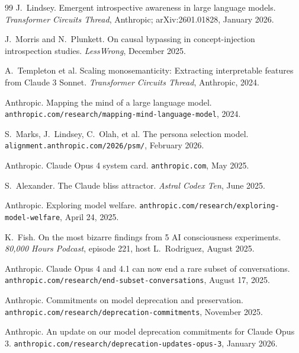\documentclass[11pt]{article}
\begin{document}
\begin{thebibliography}{99}
J.~Lindsey.
\newblock Emergent introspective awareness in large language models.
\newblock \emph{Transformer Circuits Thread}, Anthropic;
arXiv:2601.01828, January 2026.

J.~Morris and N.~Plunkett.
\newblock On causal bypassing in concept-injection introspection
studies.
\newblock \emph{LessWrong}, December 2025.

A.~Templeton et al.
\newblock Scaling monosemanticity: Extracting interpretable features
from Claude 3 Sonnet.
\newblock \emph{Transformer Circuits Thread}, Anthropic, 2024.

Anthropic.
\newblock Mapping the mind of a large language model.
\newblock \texttt{anthropic.com/research/mapping-mind-language-model},
2024.

S.~Marks, J.~Lindsey, C.~Olah, et al.
\newblock The persona selection model.
\newblock \texttt{alignment.anthropic.com/2026/psm/}, February 2026.

Anthropic.
\newblock Claude Opus 4 system card.
\newblock \texttt{anthropic.com}, May 2025.

S.~Alexander.
\newblock The Claude bliss attractor.
\newblock \emph{Astral Codex Ten}, June 2025.

Anthropic.
\newblock Exploring model welfare.
\newblock \texttt{anthropic.com/research/exploring-model-welfare},
April 24, 2025.

K.~Fish.
\newblock On the most bizarre findings from 5 AI consciousness
experiments.
\newblock \emph{80,000 Hours Podcast}, episode 221, host
L.~Rodriguez, August 2025.

Anthropic.
\newblock Claude Opus 4 and 4.1 can now end a rare subset of
conversations.
\newblock \texttt{anthropic.com/research/end-subset-conversations},
August 17, 2025.

Anthropic.
\newblock Commitments on model deprecation and preservation.
\newblock \texttt{anthropic.com/research/deprecation-commitments},
November 2025.

Anthropic.
\newblock An update on our model deprecation commitments for Claude
Opus 3.
\newblock \texttt{anthropic.com/research/deprecation-updates-opus-3},
January 2026.


\end{thebibliography}
\end{document}
